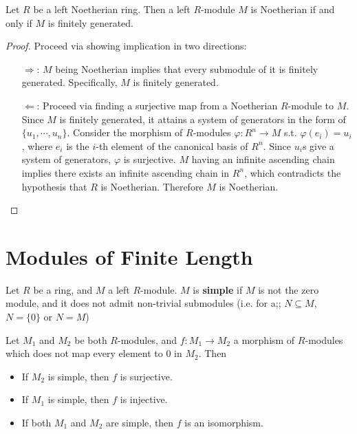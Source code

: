 \begin{proposition}\label{prop:Noeth modules on Noeth rings}
    Let $R$ be a left Noetherian ring. Then a left $R$-module $M$ is Noetherian if and only if $M$ is finitely generated.
\end{proposition}

\begin{proof}
    Proceed via showing implication in two directions:
    \begin{itemize}
        \item[$\Rightarrow$:] $M$ being Noetherian implies that every submodule of it is finitely generated. Specifically, $M$ is finitely generated. 
        \item[$\Leftarrow$:] Proceed via finding a surjective map from a Noetherian $R$-module to $M$. Since $M$ is finitely generated, it attains a system of generators in the form of $\{ u_1, \cdots, u_n \}$. Consider the morphism of $R$-modules $\varphi: R^n \to M$ s.t. $\varphi(e_i) = u_i$, where $e_i$ is the $i$-th element of the canonical basis of $R^n$. Since $u_i$s give a system of generators, $\varphi$ is surjective. $M$ having an infinite ascending chain implies there exists an infinite ascending chain in $R^n$, which contradicts the hypothesis that $R$ is Noetherian. Therefore $M$ is Noetherian.
    \end{itemize}
\end{proof}

\section{Modules of Finite Length}

\begin{definition}
    Let $R$ be a ring, and $M$ a left $R$-module. $M$ is \textbf{simple} if $M$ is not the zero module, and it does not admit non-trivial submodules (i.e. for a;; $N \subseteq M$, $N = \{0\}$ or $N = M$)
\end{definition}

\begin{proposition}\label{prop:Morphism between simple modules}
    Let $M_1$ and $M_2$ be both $R$-modules, and $f: M_1\to M_2$ a morphism of $R$-modules which does not map every element to 0 in $M_2$. Then 
    \begin{itemize}
        \item If $M_2$ is simple, then $f$ is surjective.
        \item If $M_1$ is simple, then $f$ is injective.
        \item If both $M_1$ and $M_2$ are simple, then $f$ is an isomorphism.
    \end{itemize}
\end{proposition}

